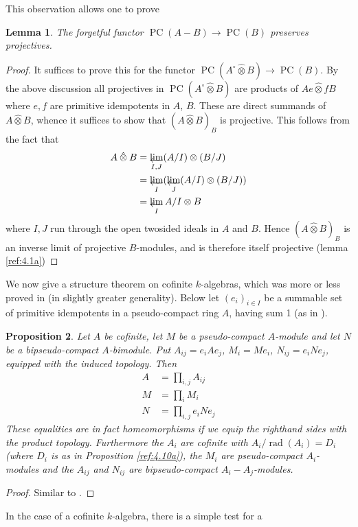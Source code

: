 \documentclass{amsproc}
\def\ctimes{\mathbin{\hat{\otimes}}}
\def\rad{\operatorname {rad}}
\def\r{\rightarrow}
\let\invlim\projlim
\DeclareMathOperator{\PC}{PC}
\newtheorem{lemma}{Lemma}[section]
\newtheorem{proposition}[lemma]{Proposition}
\theoremstyle{definition}
\theoremstyle{remark}
\def\invlim{\mathop{\vtop{\baselineskip -100pt\lineskip -1pt\lineskiplimit 0pt
\setbox0\hbox{\upshape lim}\copy0\hbox to \wd0{\leftarrowfill}}}\limits}
\numberwithin{equation}{section}
\numberwithin{table}{section}
\numberwithin{figure}{section}
\begin{document}
 This observation
allows one to prove
\begin{lemma} 
\label{ref:4.15a}
The forgetful functor $\PC(A-B)\r \PC(B)$ preserves
projectives. 
\end{lemma}
\begin{proof} It suffices to prove this for the functor
  $\PC(A^\circ\ctimes B)\r \PC(B)$. By the above discussion all
  projectives in $\PC(A^\circ\ctimes B)$ are products of $ Ae\ctimes
  fB$ where $e,f$ are primitive idempotents in $A$, $B$. These are
  direct summands of $A\ctimes B$, whence it suffices to show that
  $(A\ctimes B)_B$ is projective. This follows from the fact that
\begin{align*}
A\ctimes B&
=\invlim_{I,J} (A/I)\otimes (B/J)\\
&=\invlim_I(\invlim_J (A/I)\otimes (B/J))\\
&=\invlim_I A/I\otimes B
\end{align*}
where $I,J$ run through the open twosided ideals in $A$ and $B$. Hence
$(A\ctimes B)_B$ is an inverse limit of projective $B$-modules, and is
therefore itself projective (lemma \ref{ref:4.1a})
\end{proof}
We now give a  structure theorem on cofinite $k$-algebras, which was more
or less proved 
 in \cite{VdBVG} (in slightly greater generality).
Below let $(e_i)_{i\in I}$ be a summable set
of primitive idempotents in a pseudo-compact ring $A$, having sum 1 (as in
\cite{Gabriel}). 
\begin{proposition}
\label{ref:4.16a}
  Let $A$ be cofinite, let $M$ be a pseudo-compact $A$-module and let
  $N$ be a bipseudo-compact $A$-bimodule. Put $A_{ij}=e_iAe_j$,
  $M_i=Me_i$, $N_{ij}=e_iNe_j$, equipped with the induced topology.
  Then \begin{align} A&=\prod_{i,j} A_{ij}\label{ref:4.10b}\\ 
    M&=\prod_i M_i\label{ref:4.11b}\\
N&=\prod_{i,j} e_iNe_j 
\end{align}
These equalities are in fact homeomorphisms if we equip the righthand
sides with the product topology. Furthermore the $A_i$ are cofinite
with $A_i/\rad(A_i)=D_i$ (where $D_i$ is as in Proposition
\ref{ref:4.10a}), the $M_i$ are pseudo-compact $A_i$-modules and the
$A_{ij}$ and $N_{ij}$ are bipseudo-compact $A_i-A_j$-modules. \end{proposition}
\begin{proof}
Similar to \cite[Prop.\ 4.3]{VdBVG}.
\end{proof}
In the case of a cofinite $k$-algebra, there is a simple test for a
\end{document}
